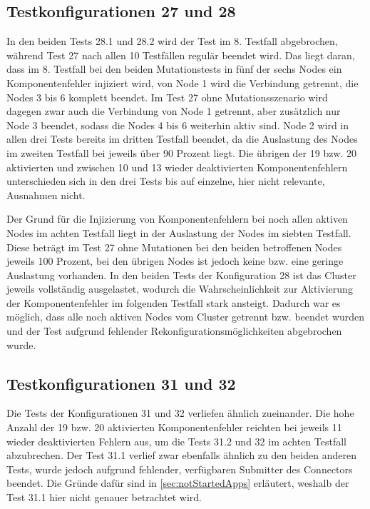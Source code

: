 \subsection{Testkonfigurationen 27 und 28}
\label{sec:noReconf2728}

In den beiden Tests 28.1 und 28.2 wird der Test im 8. Testfall abgebrochen, während Test 27 nach allen 10 Testfällen regulär beendet wird.
Das liegt daran, dass im 8. Testfall bei den beiden Mutationstests in fünf der sechs Nodes ein Komponentenfehler injiziert wird, von Node 1 wird die Verbindung getrennt, die Nodes 3 bis 6 komplett beendet.
Im Test 27 ohne Mutationsszenario wird dagegen zwar auch die Verbindung von Node 1 getrennt, aber zusätzlich nur Node 3 beendet, sodass die Nodes 4 bis 6 weiterhin aktiv sind.
Node 2 wird in allen drei Tests bereits im dritten Testfall beendet, da die Auslastung des Nodes im zweiten Testfall bei jeweils über 90 Prozent liegt.
Die übrigen der 19 bzw. 20 aktivierten und zwischen 10 und 13 wieder deaktivierten Komponentenfehlern unterschieden sich in den drei Tests bis auf einzelne, hier nicht relevante, Ausnahmen nicht.

Der Grund für die Injizierung von Komponentenfehlern bei noch allen aktiven Nodes im achten Testfall liegt in der Auslastung der Nodes im siebten Testfall.
Diese beträgt im Test 27 ohne Mutationen bei den beiden betroffenen Nodes jeweils 100 Prozent, bei den übrigen Nodes ist jedoch keine bzw. eine geringe Auslastung vorhanden.
In den beiden Tests der Konfiguration 28 ist das Cluster jeweils vollständig ausgelastet, wodurch die Wahrscheinlichkeit zur Aktivierung der Komponentenfehler im folgenden Testfall stark ansteigt.
Dadurch war es möglich, dass alle noch aktiven Nodes vom Cluster getrennt bzw. beendet wurden und der Test aufgrund fehlender Rekonfigurationsmöglichkeiten abgebrochen wurde.

\subsection{Testkonfigurationen 31 und 32}
\label{sec:noReconf3132}

Die Tests der Konfigurationen 31 und 32 verliefen ähnlich zueinander.
Die hohe Anzahl der 19 bzw. 20 aktivierten Komponentenfehler reichten bei jeweils 11 wieder deaktivierten Fehlern aus, um die Tests 31.2 und 32 im achten Testfall abzubrechen.
Der Test 31.1 verlief zwar ebenfalls ähnlich zu den beiden anderen Tests, wurde jedoch aufgrund fehlender, verfügbaren Submitter des Connectors beendet.
Die Gründe dafür sind in \autoref{sec:notStartedApps} erläutert, weshalb der Test 31.1 hier nicht genauer betrachtet wird.

